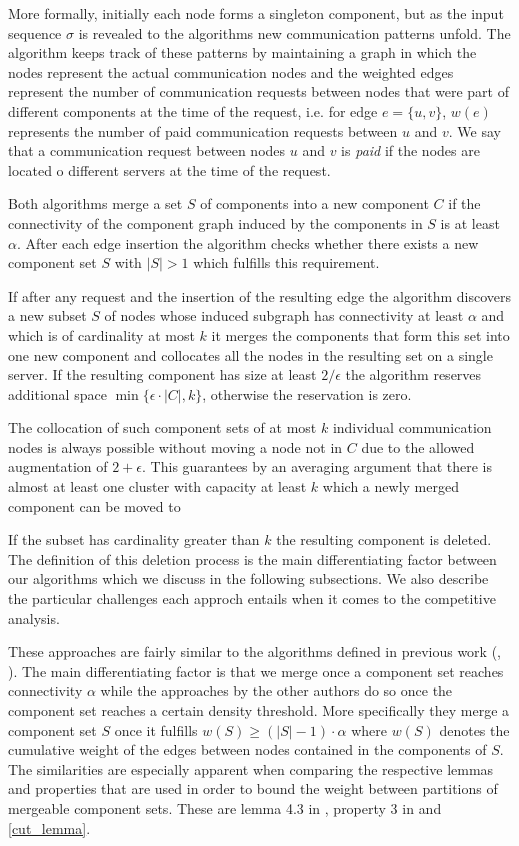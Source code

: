 \documentclass[a4paper,xcolor=dvipsnames, tikz, 12pt]{article}
\theoremstyle{definition}
\begin{document}
	More formally, initially each node forms a singleton component, but as the input sequence $\sigma$ is revealed to the algorithms new communication patterns unfold. The algorithm keeps track of these patterns by maintaining a graph in which the nodes represent the actual communication nodes and the weighted edges represent the number of communication requests between nodes that were part of different components at the time of the request, i.e. for edge $e=\{u,v\}$, $w(e)$ represents the number of paid communication requests between $u$ and $v$. We say that a communication request between nodes $u$ and $v$ is \textit{paid} if the nodes are located o different servers at the time of the request.
	
	Both algorithms merge a set $S$ of components into a new component $C$ if the connectivity of the component graph induced by the components in $S$ is at least $\alpha$. After each edge insertion the algorithm checks whether there exists a new component set $S$ with $|S|>1$ which fulfills this requirement.
	
	If after any request and the insertion of the resulting edge the algorithm discovers a new subset $S$ of nodes whose induced subgraph has connectivity at least $\alpha$ and which is of cardinality at most $k$ it merges the components that form this set into one new component and collocates all the nodes in the resulting set on a single server. If the resulting component has size at least $2/\epsilon$ the algorithm reserves additional space $\min\{\epsilon\cdot|C|,k\}$, otherwise the reservation is zero.
	
	The collocation of such component sets of at most $k$ individual communication nodes is always possible without moving a node not in $C$ due to the allowed augmentation of $2+\epsilon$. This guarantees by an averaging argument that there is almost at least one cluster with capacity at least $k$ which a newly merged component can be moved to 
	
	If the subset has cardinality greater than $k$ the resulting component is deleted. The definition of this deletion process is the main differentiating factor between our algorithms which we discuss in the following subsections. We also describe the particular challenges each approch entails when it comes to the competitive analysis.
	
	These approaches are fairly similar to the algorithms defined in previous work (\cite{Avin2015}, \cite{Avin2015a}). The main differentiating factor is that we merge once a component set reaches connectivity $\alpha$ while the approaches by the other authors do so once the component set reaches a certain density threshold. More specifically they merge a component set $S$ once it fulfills $w(S)\geq(|S|-1)\cdot\alpha$ where $w(S)$ denotes the cumulative weight of the edges between nodes contained in the components of $S$.
	The similarities are especially apparent when comparing the respective lemmas and properties that are used in order to bound the weight between partitions of mergeable component sets. These are lemma 4.3 in \cite{Avin2015a}, property 3 in \cite{Avin2015} and \cref{cut_lemma}.
	
\end{document}
